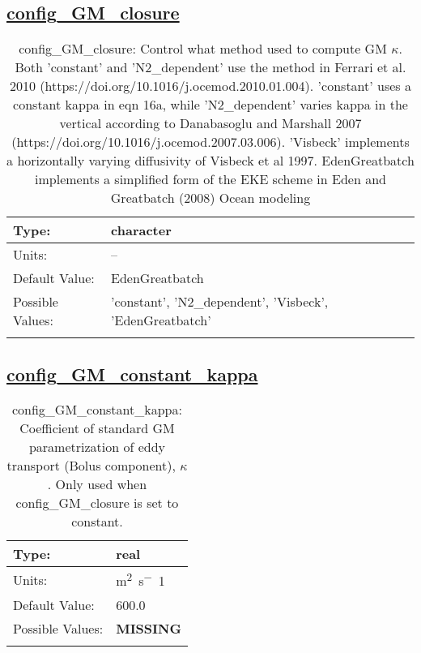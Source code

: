 \subsection[config\_GM\_closure]{\hyperref[sec:nm_tab_GM_eddy_parameterization]{config\_GM\_closure}}
\label{subsec:nm_sec_config_GM_closure}
\begin{center}
\begin{longtable}{| p{2.0in} || p{4.0in} |}
    \hline
    Type: & character \\
    \hline
    Units: & -- \\
    \hline
    Default Value: & EdenGreatbatch \\
    \hline
    Possible Values: & 'constant', 'N2\_dependent', 'Visbeck', 'EdenGreatbatch' \\
    \hline
    \caption{config\_GM\_closure: Control what method used to compute GM $\kappa$. Both 'constant' and 'N2\_dependent' use the method in Ferrari et al. 2010 (https://doi.org/10.1016/j.ocemod.2010.01.004). 'constant' uses a constant kappa in eqn 16a, while 'N2\_dependent' varies kappa in the vertical according to Danabasoglu and Marshall 2007 (https://doi.org/10.1016/j.ocemod.2007.03.006). 'Visbeck' implements a horizontally varying diffusivity of Visbeck et al 1997. EdenGreatbatch implements a simplified form of the EKE scheme in Eden and Greatbatch (2008) Ocean modeling}
\end{longtable}
\end{center}
\subsection[config\_GM\_constant\_kappa]{\hyperref[sec:nm_tab_GM_eddy_parameterization]{config\_GM\_constant\_kappa}}
\label{subsec:nm_sec_config_GM_constant_kappa}
\begin{center}
\begin{longtable}{| p{2.0in} || p{4.0in} |}
    \hline
    Type: & real \\
    \hline
    Units: & \si{m^2.s^-1} \\
    \hline
    Default Value: & 600.0 \\
    \hline
    Possible Values: & {\bf \color{red} MISSING} \\
    \hline
    \caption{config\_GM\_constant\_kappa: Coefficient of standard GM parametrization of eddy transport (Bolus component), $\kappa$. Only used when config\_GM\_closure is set to constant.}
\end{longtable}
\end{center}
